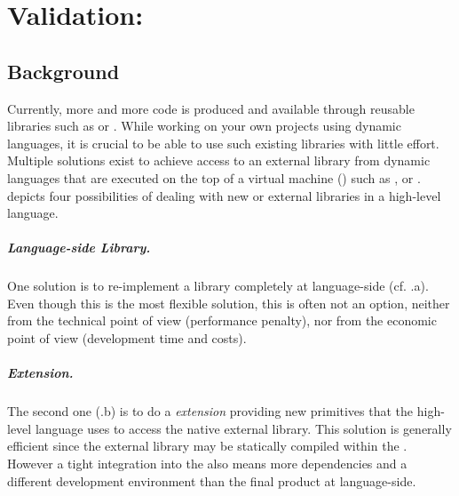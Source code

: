 
\chapter{Validation: \FFI}
\minitoc
\introduction

\newpage
\section{Background}


Currently, more and more code is produced and available through reusable libraries such as  or .
While working on your own projects using dynamic languages, it is crucial to be able to use such existing libraries with little effort.
Multiple solutions exist to achieve access to an external library from dynamic languages that are executed on the top of a virtual machine (\VM) such as ,  or .
 depicts four possibilities of dealing with new or external libraries in a high-level language.

\paragraph{Language-side Library.}
One solution is to re-implement a library completely at language-side (cf. .a).
Even though this is the most flexible solution, this is often not an option, neither from the technical point of view (performance penalty), nor from the economic point of view (development time and costs).

\paragraph{\VM Extension.}
The second one (.b) is to do a \emph{\VM extension} providing new primitives that the high-level language uses to access the native external library.
This solution is generally efficient since the external library may be statically compiled within the \VM.
However a tight integration into the \VM also means more dependencies and a different development environment than the final product at language-side.


